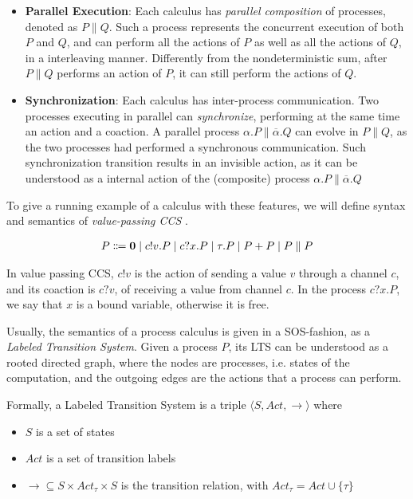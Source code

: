 \begin{itemize}
\item \textbf{Parallel Execution}: Each calculus has \textit{parallel composition} of processes, denoted as $P \parallel Q$. Such a process represents the concurrent execution of both $P$ and $Q$, and can perform all the actions of $P$ as well as all the actions of $Q$, in a interleaving manner. Differently from the nondeterministic sum, after $P\parallel Q$ performs an action of $P$, it can still perform the actions of $Q$.
\item \textbf{Synchronization}: Each calculus has inter-process communication. Two processes executing in parallel can \textit{synchronize}, performing at the same time an action and a coaction. A parallel process $\alpha.P \parallel \overline{\alpha}.Q$ can evolve in $P \parallel Q$, as the two processes had performed a synchronous communication. Such synchronization transition results in an invisible action, as it can be understood as a internal action of the (composite) process $\alpha.P \parallel \overline{\alpha}.Q$ 

\end{itemize}

To give a running example of a calculus with these features, we will define syntax and semantics of \textit{value-passing CCS} \cite{hennessyTheoryCommunicatingProcesses1993}.

\begin{align*}
  P \Coloneqq \mathbf{0} \mid c!v. P \mid c?x.P \mid \tau.P \mid P + P \mid P \parallel P
\end{align*}	

In value passing CCS, $c!v$ is the action of sending a value $v$ through a channel $c$, and its coaction is $c?v$, of receiving a value from channel $c$. In the process $c?x.P$, we say that $x$ is a bound variable, otherwise it is free.

Usually, the semantics of a process calculus is given in a SOS-fashion, as a \textit{Labeled Transition System}. Given a process $P$, its LTS can be understood as a rooted directed graph, where the nodes are processes, i.e. states of the computation, and the outgoing edges are the actions that a process can perform.

Formally, a Labeled Transition System is a triple $\langle S , Act, \rightarrow \rangle$ where \begin{itemize}
\item $S$ is a set of states
\item $Act$ is a set of transition labels
\item $\rightarrow 	\subseteq S\times Act_\tau \times S$ is the transition relation, with $Act_\tau = Act \cup \{\tau\}$
\end{itemize} 

